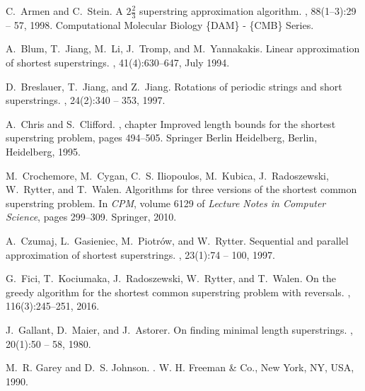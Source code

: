 \documentclass[10pt]{article}
\begin{document}
{\small 
\begin{thebibliography}{10}

C.~Armen and C.~Stein.
\newblock A $2 \frac{2}{3}$ superstring approximation algorithm.
, 88(1–3):29 -- 57, 1998.
\newblock Computational Molecular Biology \{DAM\} - \{CMB\} Series.

A.~Blum, T.~Jiang, M.~Li, J.~Tromp, and M.~Yannakakis.
\newblock Linear approximation of shortest superstrings.
, 41(4):630--647, July 1994.

D.~Breslauer, T.~Jiang, and Z.~Jiang.
\newblock Rotations of periodic strings and short superstrings.
, 24(2):340 -- 353, 1997.

A.~Chris and S.~Clifford.
, chapter Improved
  length bounds for the shortest superstring problem, pages 494--505.
\newblock Springer Berlin Heidelberg, Berlin, Heidelberg, 1995.

M.~Crochemore, M.~Cygan, C.~S. Iliopoulos, M.~Kubica, J.~Radoszewski,
  W.~Rytter, and T.~Walen.
\newblock Algorithms for three versions of the shortest common superstring
  problem.
\newblock In {\em {CPM}}, volume 6129 of {\em Lecture Notes in Computer
  Science}, pages 299--309. Springer, 2010.

A.~Czumaj, L.~Gasieniec, M.~Piotr\'ow, and W.~Rytter.
\newblock Sequential and parallel approximation of shortest superstrings.
, 23(1):74 -- 100, 1997.

G.~Fici, T.~Kociumaka, J.~Radoszewski, W.~Rytter, and T.~Walen.
\newblock On the greedy algorithm for the shortest common superstring problem
  with reversals.
, 116(3):245--251, 2016.

J.~Gallant, D.~Maier, and J.~Astorer.
\newblock On finding minimal length superstrings.
, 20(1):50 -- 58, 1980.

M.~R. Garey and D.~S. Johnson.
.
\newblock W. H. Freeman \& Co., New York, NY, USA, 1990.


\end{thebibliography}}
\end{document}
